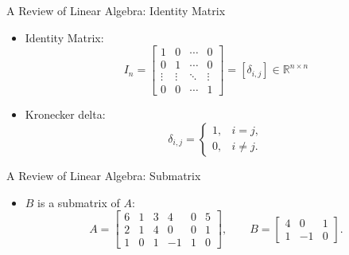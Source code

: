 \documentclass[aspectratio=169,hyperref,UTF8,CJK]{beamer}
\newcommand{\R}{\mathbb{R}}
\begin{document}
\begin{frame}{A Review of Linear Algebra: Identity Matrix}
  \begin{itemize}
    \item Identity Matrix:
      \begin{equation*}
        I_n=\begin{bmatrix}
          1&0&\cdots&0\\
          0&1&\cdots&0\\
          \vdots&\vdots&\ddots&\vdots\\
          0&0&\cdots&1
        \end{bmatrix}=[\delta_{i,j}]\in\R^{n\times n}
      \end{equation*}
    \item Kronecker delta:
      \begin{equation*}
        \delta_{i,j}=\begin{cases}1,&i=j,\\0,&i\ne j.\end{cases}
      \end{equation*}
  \end{itemize}
\end{frame}

\begin{frame}{A Review of Linear Algebra: Submatrix}
  \begin{itemize}
    \item $B$ is a submatrix of $A$:
      \begin{equation*}
        A=\begin{bmatrix}
          6&1&3&4&0&5\\
          2&1&4&0&0&1\\
          1&0&1&-1&1&0
        \end{bmatrix},
        \qquad
        B=\begin{bmatrix}4&0&1\\1&-1&0\end{bmatrix}.
      \end{equation*}
  \end{itemize}
\end{frame}
\end{document}
